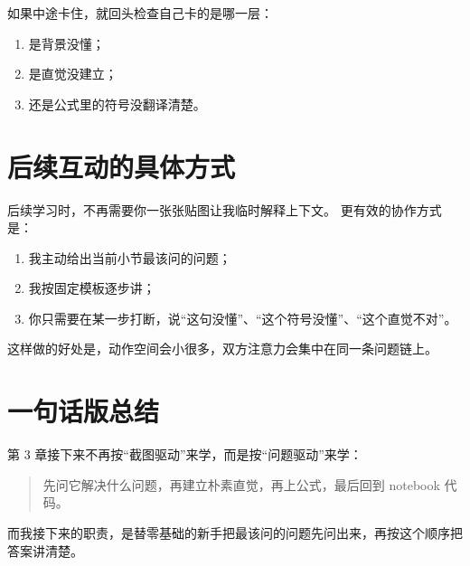 \documentclass[12pt,a4paper]{ctexart}
\begin{document}
如果中途卡住，就回头检查自己卡的是哪一层：

\begin{enumerate}[leftmargin=2em]
  \item 是背景没懂；
  \item 是直觉没建立；
  \item 还是公式里的符号没翻译清楚。
\end{enumerate}

\section{后续互动的具体方式}

后续学习时，不再需要你一张张贴图让我临时解释上下文。
更有效的协作方式是：

\begin{enumerate}[leftmargin=2em]
  \item 我主动给出当前小节最该问的问题；
  \item 我按固定模板逐步讲；
  \item 你只需要在某一步打断，说``这句没懂''、``这个符号没懂''、``这个直觉不对''。
\end{enumerate}

这样做的好处是，动作空间会小很多，双方注意力会集中在同一条问题链上。

\section{一句话版总结}

第 3 章接下来不再按``截图驱动''来学，而是按``问题驱动''来学：

\begin{quote}
先问它解决什么问题，再建立朴素直觉，再上公式，最后回到 notebook 代码。
\end{quote}

而我接下来的职责，是替零基础的新手把最该问的问题先问出来，再按这个顺序把答案讲清楚。
\end{document}
